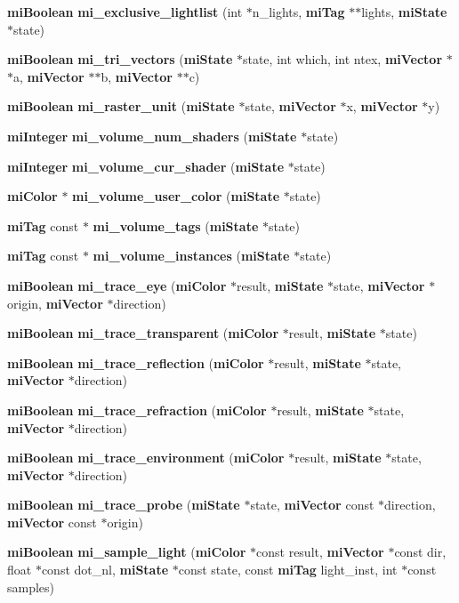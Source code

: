 \begin{CompactItemize}
{\bf mi\-Boolean} {\bf mi\_\-exclusive\_\-lightlist} (int $\ast$n\_\-lights, {\bf mi\-Tag} $\ast$$\ast$lights, {\bf mi\-State} $\ast$state)
\item 
{\bf mi\-Boolean} {\bf mi\_\-tri\_\-vectors} ({\bf mi\-State} $\ast$state, int which, int ntex, {\bf mi\-Vector} $\ast$$\ast$a, {\bf mi\-Vector} $\ast$$\ast$b, {\bf mi\-Vector} $\ast$$\ast$c)
\item 
{\bf mi\-Boolean} {\bf mi\_\-raster\_\-unit} ({\bf mi\-State} $\ast$state, {\bf mi\-Vector} $\ast$x, {\bf mi\-Vector} $\ast$y)
\item 
{\bf mi\-Integer} {\bf mi\_\-volume\_\-num\_\-shaders} ({\bf mi\-State} $\ast$state)
\item 
{\bf mi\-Integer} {\bf mi\_\-volume\_\-cur\_\-shader} ({\bf mi\-State} $\ast$state)
\item 
{\bf mi\-Color} $\ast$ {\bf mi\_\-volume\_\-user\_\-color} ({\bf mi\-State} $\ast$state)
\item 
{\bf mi\-Tag} const $\ast$ {\bf mi\_\-volume\_\-tags} ({\bf mi\-State} $\ast$state)
\item 
{\bf mi\-Tag} const $\ast$ {\bf mi\_\-volume\_\-instances} ({\bf mi\-State} $\ast$state)
\item 
{\bf mi\-Boolean} {\bf mi\_\-trace\_\-eye} ({\bf mi\-Color} $\ast$result, {\bf mi\-State} $\ast$state, {\bf mi\-Vector} $\ast$origin, {\bf mi\-Vector} $\ast$direction)
\item 
{\bf mi\-Boolean} {\bf mi\_\-trace\_\-transparent} ({\bf mi\-Color} $\ast$result, {\bf mi\-State} $\ast$state)
\item 
{\bf mi\-Boolean} {\bf mi\_\-trace\_\-reflection} ({\bf mi\-Color} $\ast$result, {\bf mi\-State} $\ast$state, {\bf mi\-Vector} $\ast$direction)
\item 
{\bf mi\-Boolean} {\bf mi\_\-trace\_\-refraction} ({\bf mi\-Color} $\ast$result, {\bf mi\-State} $\ast$state, {\bf mi\-Vector} $\ast$direction)
\item 
{\bf mi\-Boolean} {\bf mi\_\-trace\_\-environment} ({\bf mi\-Color} $\ast$result, {\bf mi\-State} $\ast$state, {\bf mi\-Vector} $\ast$direction)
\item 
{\bf mi\-Boolean} {\bf mi\_\-trace\_\-probe} ({\bf mi\-State} $\ast$state, {\bf mi\-Vector} const $\ast$direction, {\bf mi\-Vector} const $\ast$origin)
\item 
{\bf mi\-Boolean} {\bf mi\_\-sample\_\-light} ({\bf mi\-Color} $\ast$const result, {\bf mi\-Vector} $\ast$const dir, float $\ast$const dot\_\-nl, {\bf mi\-State} $\ast$const state, const {\bf mi\-Tag} light\_\-inst, int $\ast$const samples)

\end{CompactItemize}
